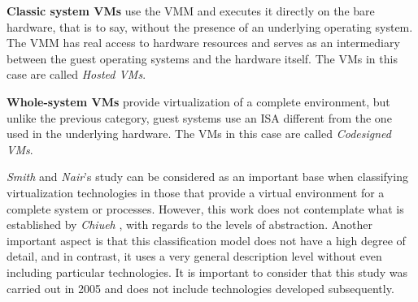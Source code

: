 		

	\textbf{Classic system VMs} use the VMM and executes it directly on the bare hardware, that is to say, without the presence of an underlying operating system. The VMM  has real access to hardware resources and serves as an intermediary between the guest operating systems and the hardware itself. The VMs in this case are called \textit{Hosted VMs}.
		
	\textbf{Whole-system VMs} provide virtualization of a complete environment, but unlike the previous category, guest systems use an ISA different from the one used in the underlying hardware. The VMs in this case are called \textit{Codesigned VMs}.


	
	\textit{Smith} and \textit{Nair}'s study \cite{Smith2005} can be considered as an important base when classifying virtualization technologies in those that provide a virtual environment for a complete system or processes. However, this work does not contemplate what is established by \textit{Chiueh} \cite{Chiueh2005}, with regards to the levels of abstraction. Another important aspect is that this classification model does not have a high degree of detail, and in contrast, it uses a very general description level without even including particular technologies. It is important to consider that this study was carried out in 2005 and does not include technologies developed  subsequently.
	
